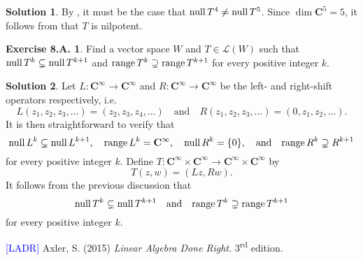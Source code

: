 \documentclass[12pt]{article}
\theoremstyle{definition}
\theoremstyle{exercise}
\newtheorem{exercise}{Exercise 8.A.}
\theoremstyle{solution}
\newtheorem*{solution}{Solution}
\newcommand{\lmap}{\mathcal{L}}
\newcommand{\ts}{\textsuperscript}
\newcommand{\Null}{\text{null\,}}
\newcommand{\Range}{\text{range\,}}
\newcommand{\quand}{\quad \text{and} \quad}
\newcommand{\C}{\mathbf{C}}
\begin{document}
\begin{solution}
    By , it must be the case that \( \Null T^4 \neq \Null T^5 \). Since \( \dim \C^5 = 5 \), it follows from  that \( T \) is nilpotent.
\end{solution}

\begin{exercise}
\label{ex:21}
    Find a vector space \( W \) and \( T \in \lmap(W) \) such that \( \Null T^k \subsetneq \Null T^{k+1} \) and \( \Range T^k \supsetneq \Range T^{k+1} \) for every positive integer \( k \).
\end{exercise}

\begin{solution}
    Let \( L : \C^{\infty} \to \C^{\infty} \) and \( R : \C^{\infty} \to \C^{\infty} \) be the left- and right-shift operators respectively, i.e.\
    \[
        L(z_1, z_2, z_3, \ldots) = (z_2, z_3, z_4, \ldots) \quand R(z_1, z_2, z_3, \ldots) = (0, z_1, z_2, \ldots).
    \]
    It is then straightforward to verify that
    \[
        \Null L^k \subsetneq \Null L^{k+1}, \quad \Range L^k = \C^{\infty}, \quad \Null R^k = \{ 0 \}, \quand \Range R^k \supsetneq R^{k+1}
    \]
    for every positive integer \( k \). Define \( T : \C^{\infty} \times \C^{\infty} \to \C^{\infty} \times \C^{\infty} \) by
    \[
        T(z, w) = (Lz, Rw).
    \]
    It follows from the previous discussion that
    \[
        \Null T^k \subsetneq \Null T^{k+1} \quand \Range T^k \supsetneq \Range T^{k+1}
    \]
    for every positive integer \( k \).
\end{solution}

\noindent \hrulefill

\noindent \hypertarget{ladr}{\textcolor{blue}{[LADR]} Axler, S. (2015) \textit{Linear Algebra Done Right.} 3\ts{rd} edition.}
\end{document}
